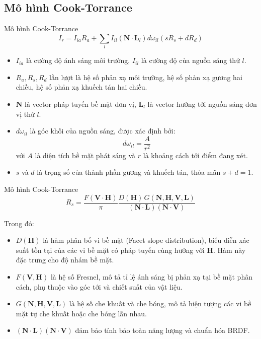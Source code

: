 \documentclass[11pt, aspectratio=169]{beamer}
\begin{document}
\subsection{Mô hình Cook-Torrance}
\begin{frame}{Mô hình Cook-Torrance}
	\begin{equation}
		I_r = I_{ia}R_a + \sum_{l} I_{il} (\mathbf{N} \cdot \mathbf{L}_l) d\omega_{il} (sR_s + dR_d)
	\end{equation}

	\begin{itemize}
		\item $I_{ia}$ là cường độ ánh sáng môi trường, $I_{il}$ là cường độ của nguồn sáng thứ $l$.
		\item $R_a, R_s, R_d$ lần lượt là hệ số phản xạ môi trường, hệ số phản xạ gương hai chiều, hệ số phản xạ khuếch tán hai chiều.
		\item $\mathbf{N}$ là vector pháp tuyến bề mặt đơn vị,  $\mathbf{L}_l$ là vector hướng tới nguồn sáng đơn vị thứ $l$.
		\item $d\omega_{il}$ là góc khối của nguồn sáng, được xác định bởi:
		\begin{equation}
			d\omega_{il} = \frac{A}{r^2}
		\end{equation}
		với $A$ là diện tích bề mặt phát sáng và $r$ là khoảng cách tới điểm đang xét.
		\item $s$ và $d$ là trọng số của thành phần gương và khuếch tán, thỏa mãn $s + d = 1$.
	\end{itemize}
\end{frame}

\begin{frame}{Mô hình Cook-Torrance}
	\begin{equation}\label{eq:specular}
		R_s = \frac{F(\mathbf{V} \cdot \mathbf{H})}{\pi} \frac{D(\mathbf{H})\,G(\mathbf{N}, \mathbf{H}, \mathbf{V}, \mathbf{L})}{(\mathbf{N} \cdot \mathbf{L})(\mathbf{N} \cdot \mathbf{V})}
	\end{equation}
	
	Trong đó:
	
	\begin{itemize}
		\item $D(\mathbf{H})$ là hàm phân bố vi bề mặt (Facet slope distribution), biểu diễn xác suất tồn tại của các vi bề mặt có pháp tuyến cùng hướng với $\mathbf{H}$. Hàm này đặc trưng cho độ nhám bề mặt.
		\item $F(\mathbf{V}, \mathbf{H})$ là hệ số Fresnel, mô tả tỉ lệ ánh sáng bị phản xạ tại bề mặt phân cách, phụ thuộc vào góc tới và chiết suất của vật liệu.
		\item $G(\mathbf{N}, \mathbf{H}, \mathbf{V}, \mathbf{L})$ là hệ số che khuất và che bóng, mô tả hiện tượng các vi bề mặt tự che khuất hoặc che bóng lẫn nhau.
		\item $(\mathbf{N} \cdot \mathbf{L})(\mathbf{N} \cdot \mathbf{V})$ đảm bảo tính bảo toàn năng lượng và chuẩn hóa BRDF.
	\end{itemize}
\end{frame}
\end{document}
